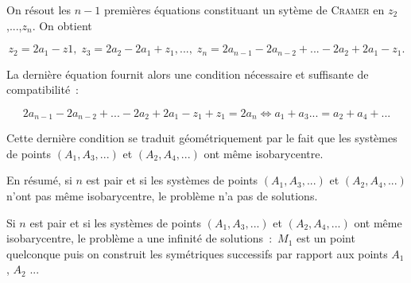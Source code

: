 {{On résout les $n-1$ premières équations constituant un sytème de \textsc{Cramer} en $z_2$,...,$z_n$. On obtient 

$$z_2=2a_1-z1,\;z_3=2a_2-2a_1+z_1,...,\;z_n=2a_{n-1}-2a_{n-2}+...-2a_2+2a_1-z_1.$$

La dernière équation fournit alors une condition nécessaire et suffisante de compatibilité~:

$$2a_{n-1}-2a_{n-2}+...-2a_2+2a_1-z_1+z_1=2a_n\Leftrightarrow a_1+a_3...=a_2+a_4+...$$

Cette dernière condition se traduit géométriquement par le fait que les systèmes de points $(A_1,A_3,...)$ et
$(A_2,A_4,...)$ ont même isobarycentre.

En résumé, si $n$ est pair et si les systèmes de points $(A_1,A_3,...)$ et $(A_2,A_4,...)$ n'ont pas même isobarycentre, le problème n'a pas de solutions.

Si $n$ est pair et si les systèmes de points $(A_1,A_3,...)$ et $(A_2,A_4,...)$ ont même isobarycentre, le problème a une infinité de solutions~:~$M_1$ est un point quelconque puis on construit les symétriques successifs par rapport aux points $A_1$, $A_2$ ...
}
}
